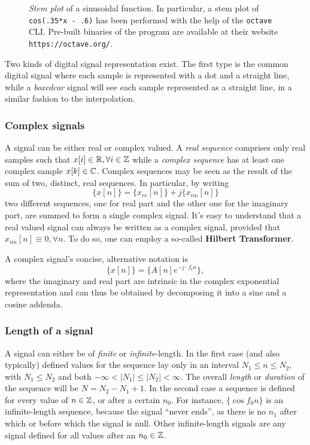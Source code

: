 \documentclass[\documentfontsize, twocolumn]{\classname}
\begin{document}
\begin{figure}[ht]
\begin{center}
\scalebox{0.6}{

}\caption{\emph{Stem plot} of a sinusoidal function. In particular, a stem plot of \texttt{cos(.35*x - .6)} has been performed with the help of the \texttt{octave} CLI. Pre-built binaries of the program are available at their website \texttt{https://octave.org/}.}\label{oct:stemPlot}
\end{center}
\end{figure}

Two kinds of digital signal representation exist. The first type is the common
digital signal where each sample is represented with a dot and a straight
line, while a \emph{boxedcar} signal will see each sample represented as a
straight line, in a similar fashion to the interpolation.

\subsubsection{Complex signals}

A signal can be either real or complex valued. A \emph{real se\-quen\-ce} comprises only real samples such that $x[i] \in \mathbb R, \forall i \in \mathbb Z$ while a \emph{complex se\-quen\-ce} has at least one complex sample $x[k] \in \mathbb C$. 
Complex se\-quen\-ces may be seen as the result of the sum of two, distinct, real se\-quen\-ces.
In particular, by writing \[\{x[n]\} = \{x_{re}[n]\} + j\{x_{im}[n]\}\] two different se\-quen\-ces, one for real part and the other one for the imaginary part, are summed to form a single complex signal.
It's easy to understand that a real valued signal can always be written as a
complex signal, provided that $x_{im}[n] \equiv 0, \forall n$. To do so, one can employ a so-called \textbf{Hilbert Transformer}.

A complex signal's concise, alternative notation is \[\{x[n]\} = \{A[n]e^{-j\cdot f_t n}\},\] where the imaginary and real part are intrinsic in the complex exponential representation and can thus be obtained by decomposing it into a sine and a cosine addenda.

\subsubsection{Length of a signal}

A signal can either be of \emph{finite} or \emph{infinite}-length. In the first case (and also typically) defined values for the se\-quen\-ce lay only in an interval $N_1 \leq n \leq N_2$, with $N_1 \leq N_2$ and both $-\infty < |N_1| \leq |N_2| < \infty$. The overall \emph{length} or \emph{duration} of the se\-quen\-ce will be $N = N_2 - N_1 + 1$. In the second case a se\-quen\-ce is defined for every value of $n \in \mathbb Z$, or after a certain $n_0$. For instance, $\{\cos{f_0 n}\}$ is an infinite-length se\-quen\-ce, because the signal ``never ends'', as there is no $n_1$ after which or before which the signal is null. Other infinite-length signals are any signal defined for all values after an $n_0 \in \mathbb Z$.
\end{document}
